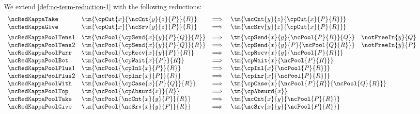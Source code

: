 \begin{definition}\label{def:nc-term-reduction-2}
  We extend \cref{def:nc-term-reduction-1} with the following reductions:
  \[
    \begin{array}{llll}
      \ncRedKappaTake
      & \tm{\cpCut{x}{\ncCnt{y}{z}{P}}{R}}
      & \Longrightarrow \;
      & \tm{\ncCnt{y}{z}{\cpCut{x}{P}{R}}}
      \\
      \ncRedKappaGive
      & \tm{\cpCut{x}{\ncSrv{y}{z}{P}}{R}}
      & \Longrightarrow \;
      & \tm{\ncSrv{y}{z}{\cpCut{x}{P}{R}}}
      \\[1ex]
      \ncRedKappaPoolTens1
      & \tm{\ncPool{\cpSend{x}{y}{P}{Q}}{R}}
      & \Longrightarrow \; 
      & \tm{\cpSend{x}{y}{\ncPool{P}{R}}{Q}}
        \quad \notFreeIn{y}{Q}
      \\
      \ncRedKappaPoolTens2
      & \tm{\ncPool{\cpSend{x}{y}{P}{Q}}{R}}
      & \Longrightarrow \; 
      & \tm{\cpSend{x}{y}{P}{\ncPool{Q}{R}}}
        \quad \notFreeIn{y}{P}
      \\
      \ncRedKappaPoolParr
      & \tm{\ncPool{\cpRecv{x}{y}{P}}{R}}
      & \Longrightarrow \;
      & \tm{\cpRecv{x}{y}{\ncPool{P}{R}}}
      \\
      \ncRedKappaPoolBot
      & \tm{\ncPool{\cpWait{x}{P}}{R}}
      & \Longrightarrow \;
      & \tm{\cpWait{x}{\ncPool{P}{R}}}
      \\
      \ncRedKappaPoolPlus1
      & \tm{\ncPool{\cpInl{x}{P}}{R}}
      & \Longrightarrow \;
      & \tm{\cpInl{x}{\ncPool{P}{R}}}
      \\
      \ncRedKappaPoolPlus2
      & \tm{\ncPool{\cpInr{x}{P}}{R}}
      & \Longrightarrow \;
      & \tm{\cpInr{x}{\ncPool{P}{R}}}
      \\
      \ncRedKappaPoolWith
      & \tm{\ncPool{\cpCase{x}{P}{Q}}{R}}
      & \Longrightarrow \;
      & \tm{\cpCase{x}{\ncPool{P}{R}}{\ncPool{Q}{R}}}
      \\
      \ncRedKappaPoolTop
      & \tm{\ncPool{\cpAbsurd{x}}{R}}
      & \Longrightarrow \;
      & \tm{\cpAbsurd{x}}
      \\
      \ncRedKappaPoolTake
      & \tm{\ncPool{\ncCnt{x}{y}{P}}{R}}
      & \Longrightarrow \;
      & \tm{\ncCnt{x}{y}{\ncPool{P}{R}}}
      \\
      \ncRedKappaPoolGive
      & \tm{\ncPool{\ncSrv{x}{y}{P}}{R}}
      & \Longrightarrow \;
      & \tm{\ncSrv{x}{y}{\ncPool{P}{R}}}
    \end{array}
  \]
\end{definition}
